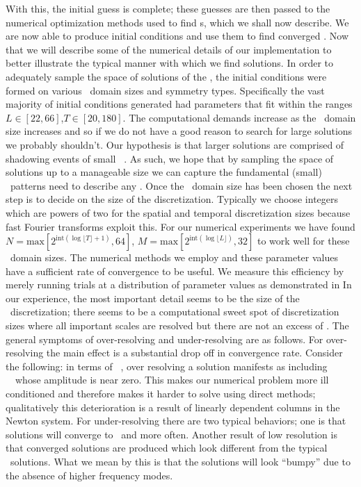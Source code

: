 With this, the initial guess is complete; these guesses are then passed
to the numerical optimization methods used to find {\po}s, which we shall now describe.
We are now able to produce initial conditions and use them
to find converged \twots. Now that we will
describe some of the numerical details of our implementation
to better illustrate the typical manner with which we find solutions.
In order to adequately sample
the space of solutions of the \KSe, the
initial conditions were formed
on various \spt\ domain sizes and symmetry types. Specifically
the vast majority of initial conditions generated had parameters
that fit within the ranges $L \in [22,66]$,$T \in [20,180]$.
The computational demands increase as the \spt\ domain size increases
and so if we do not have a good reason to search for large solutions we
probably shouldn't. Our hypothesis is that larger solutions
are comprised of shadowing events of small \spt\ \twots.
As such, we hope that by sampling the space of solutions
up to a manageable size we can capture the fundamental (small)
\spt\ patterns need to describe any \twot.
Once the \spt\ domain size has been chosen the next step
is to decide on the size of the discretization. Typically we choose
integers which are powers of two for the spatial and temporal
discretization sizes because fast Fourier transforms
exploit this. For our
numerical experiments we have found
$N=\text{max}[2^{\text{int}(\log \lfloor T \rfloor+1)},64]$,
$M=\text{max}[2^{\text{int}(\log \lfloor L \rfloor)},32]$ to
work well for these \spt\ domain sizes.
The numerical methods we employ and these parameter values
have a sufficient rate of convergence to be useful. We measure
this efficiency by merely running trials at a distribution
of parameter values as demonstrated in
In our experience, the most important detail seems to be
the size of the \spt\ discretization; there seems to be
a computational sweet spot of discretization sizes where all
important scales are resolved but there are not an excess of
\Fcs.
The general symptoms
of over-resolving and under-resolving are as follows.
For over-resolving the main effect is
a substantial drop off in convergence rate. Consider
the following: in terms of \spt\ \Fcs, over resolving
a solution manifests as including \spt\ \Fcs\ whose
amplitude is near zero. This makes our numerical problem
more ill conditioned and therefore makes it harder to
solve using direct methods; qualitatively this
deterioration is a result of linearly dependent columns
in the Newton system.
For under-resolving there are two typical behaviors; one
is that solutions will converge to \eqva\ and \reqva more often.
Another
result of low resolution is that converged solutions are
produced which look different from the typical
\KSe\ solutions. What we mean by this is that the solutions
will look ``bumpy'' due to the absence of higher frequency modes.

